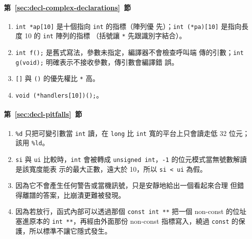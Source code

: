\paragraph{第~\ref{sec:decl-complex-declarations}~節}
\begin{enumerate}
\item \texttt{int *ap[10]} 是十個指向 \texttt{int} 的指標（陣列優
先）；\texttt{int (*pa)[10]} 是指向長度 10 的 \texttt{int} 陣列的指標
（括號讓 \texttt{*} 先跟識別字結合）。
\item \texttt{int f();} 是舊式寫法，參數未指定，編譯器不會檢查呼叫端
傳的引數；\texttt{int g(void);} 明確表示不接收參數，傳引數會編譯錯
誤。
\item \texttt{[]} 與 \texttt{()} 的優先權比 \texttt{*} 高。
\item \texttt{void (*handlers[10])();}。
\end{enumerate}

\paragraph{第~\ref{sec:decl-pitfalls}~節}
\begin{enumerate}
\item \texttt{\%d} 只把可變引數當 \texttt{int} 讀，在 \texttt{long} 比
\texttt{int} 寬的平台上只會讀走低 32 位元；該用 \texttt{\%ld}。
\item \texttt{si} 與 \texttt{ui} 比較時，\texttt{int} 會被轉成
\texttt{unsigned int}，\texttt{-1} 的位元模式當無號數解讀是該寬度能表
示的最大正數，遠大於 10，所以 \texttt{si < ui} 為假。
\item 因為它不會產生任何警告或當機訊號，只是安靜地給出一個看起來合理
但錯得離譜的答案，比崩潰更難被發現。
\item 因為若放行，函式內部可以透過那個 \texttt{const int **} 把一個
non-const 的位址塞進原本的 \texttt{int **}，再經由外面那份 non-const
指標寫入，繞過 \texttt{const} 的保護，所以標準不讓它隱式發生。
\end{enumerate}
